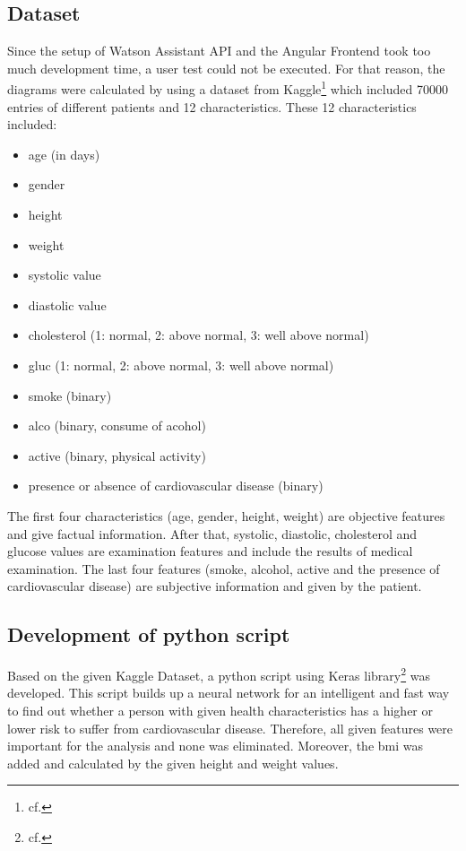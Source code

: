 \subsection{Dataset}
Since the setup of Watson Assistant API and the Angular Frontend took too much development time, a user test could not be executed. For that reason, the diagrams were calculated by using a dataset from Kaggle\footnote{cf.\autocite{kaggle}} which included 70000 entries of different patients and 12 characteristics. These 12 characteristics included:
\begin{itemize}
\setlength\itemsep{-0.5em}
  \item age (in days)
  \item gender
  \item height
  \item weight
  \item systolic value
  \item diastolic value
  \item cholesterol (1: normal, 2: above normal, 3: well above normal)
  \item gluc (1: normal, 2: above normal, 3: well above normal)
  \item smoke (binary)
  \item alco (binary, consume of acohol)
  \item active (binary, physical activity)
  \item presence or absence of cardiovascular disease (binary) 
\end{itemize}  

The first four characteristics (age, gender, height, weight) are objective features and give factual information. After that, systolic, diastolic, cholesterol and glucose values are examination features and include the results of medical examination. The last four features (smoke, alcohol, active and the presence of cardiovascular disease) are subjective information and given by the patient.

\subsection{Development of python script} \label{python}
Based on the given Kaggle Dataset, a python script using Keras library\footnote{cf.\autocite{keras}} was developed. This script builds up a neural network for an intelligent and fast way to find out whether a person with given health characteristics has a higher or lower risk to suffer from cardiovascular disease. Therefore, all given features were important for the analysis and none was eliminated. Moreover, the \ac{bmi} was added and calculated by the given height and weight values. 

